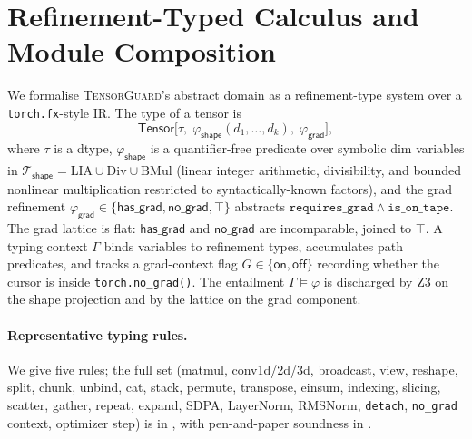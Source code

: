 \section{Refinement-Typed Calculus and Module Composition}
\label{sec:calculus}

We formalise \textsc{TensorGuard}'s abstract domain as a
refinement-type system over a \texttt{torch.fx}-style IR. The
type of a tensor is
\[
  \mathsf{Tensor}\bigl[\tau,\;\varphi_{\mathsf{shape}}(d_1,\dots,d_k),\;\varphi_{\mathsf{grad}}\bigr],
\]
where $\tau$ is a dtype, $\varphi_{\mathsf{shape}}$ is a
quantifier-free predicate over symbolic dim variables in
$\mathcal{T}_{\mathsf{shape}}=\mathrm{LIA}\cup\mathrm{Div}\cup\mathrm{BMul}$
(linear integer arithmetic, divisibility, and bounded
nonlinear multiplication restricted to syntactically-known
factors), and the grad refinement
$\varphi_{\mathsf{grad}}\in\{\mathsf{has\_grad},\mathsf{no\_grad},\top\}$
abstracts $\mathtt{requires\_grad}\wedge\mathtt{is\_on\_tape}$.
The grad lattice is flat: $\mathsf{has\_grad}$ and
$\mathsf{no\_grad}$ are incomparable, joined to $\top$. A
typing context $\Gamma$ binds variables to refinement types,
accumulates path predicates, and tracks a grad-context flag
$G\in\{\mathsf{on},\mathsf{off}\}$ recording whether the cursor
is inside \texttt{torch.no\_grad()}. The entailment
$\Gamma\models\varphi$ is discharged by Z3 on the shape
projection and by the lattice on the grad component.

\paragraph{Representative typing rules.}
We give five rules; the full set (matmul, conv1d/2d/3d,
broadcast, view, reshape, split, chunk, unbind, cat, stack,
permute, transpose, einsum, indexing, slicing, scatter,
gather, repeat, expand, SDPA, LayerNorm, RMSNorm,
\texttt{detach}, \texttt{no\_grad} context, optimizer step) is in
, with pen-and-paper soundness in
.

{\small
{}}

